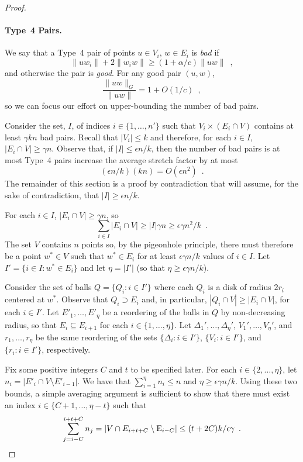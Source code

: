 \documentclass{patmorin}
\begin{document}
\begin{proof}
  \paragraph{Type~4 Pairs.}  
  We say that a Type~4 pair of points $u\in V_i$, $w\in E_i$ is
  \emph{bad} if
  \[
      \|uw_i\|+2\|w_iw\| \ge (1+\alpha/c)\|uw\| \enspace ,
  \]
  and otherwise the pair is \emph{good}.
  For any good pair $(u,w)$,
  \[
    \frac{\|uw\|_G}{\|uw\|} = 1+O(1/c) \enspace ,
  \]
  so we can focus our effort on upper-bounding the number of bad pairs.

  Consider the set, $I$, of indices $i\in\{1,\ldots,n'\}$ such that
  $V_i\times (E_i\cap V)$ contains at least $\gamma kn$ bad pairs.
  Recall that $|V_i|\le k$ and therefore, for each $i\in I$, $|E_i\cap
  V|\ge \gamma n$.  Observe that, if $|I|\le \epsilon n/k$, then the
  number of bad pairs is at most Type~4 pairs increase the average
  stretch factor by at most
  \[
     (\epsilon n/k)(kn)  = O(\epsilon n^2) \enspace .
  \]
  The remainder of this section is a proof by contradiction that will
  assume, for the sake of contradiction, that $|I|\ge \epsilon n/k$.

  For each $i\in I$, $|E_i\cap V|\ge \gamma n$, so
  \[
    \sum_{i\in I}|E_i\cap V|\ge|I|\gamma n\ge \epsilon\gamma n^2/k \enspace .
  \]
  The set $V$ contains $n$ points so, by the pigeonhole principle, there
  must therefore be a point $w^*\in V$ such that $w^*\in E_i$ for at least
  $\epsilon\gamma n/k$ values of $i\in I$.  Let $I'=\{i\in I: w^*\in E_i\}$
  and let $\eta=|I'|$ (so that $\eta\ge \epsilon\gamma n/k$).

  Consider the set of balls $Q=\{ Q_{i}:i\in I'\}$ where each $Q_i$ is a
  disk of radius $2r_i$ centered at $w^*$.  Observe that $Q_i\supset E_i$
  and, in particular, $|Q_i\cap V|\ge |E_i\cap V|$, for each $i\in I'$.
  Let $E'_1,\ldots,E'_{\eta}$ be a reordering of the balls in $Q$
  by non-decreasing radius, so that $E_{i}\subseteq E_{i+1}$ for
  each $i\in\{1,\ldots,\eta\}$. Let $\Delta_1',\ldots,\Delta_{\eta}'$,
  $V_1',\ldots,V_{\eta}'$, and $r_1,\ldots,r_{\eta}$ be the same
  reordering of the sets $\{\Delta_i:i\in I'\}$, $\{V_i:i\in I'\}$,
  and $\{r_i:i\in I'\}$, respectively.

  Fix some positive integers $C$ and $t$ to be specified later.  For each
  $i\in\{2,\ldots,\eta\}$, let $n_i=|E'_i\cap V\setminus E'_{i-1}|$. We
  have that $\sum_{i=1}^{\eta} n_i \le n$ and $\eta\ge \epsilon\gamma n/k$.
  Using these two bounds, a simple averaging argument is sufficient
  to show that there must exist an index $i\in\{C+1,\ldots,\eta-t\}$
  such that
  \begin{equation}
     \sum_{j=i-C}^{i+t+C} n_j 
        = |V\cap E_{i+t+C}\setminus \E_{i-C}| 
          \le (t+2C)k/\epsilon\gamma \enspace . \eqlabel{sparse}
  \end{equation}


\end{proof}
\end{document}
